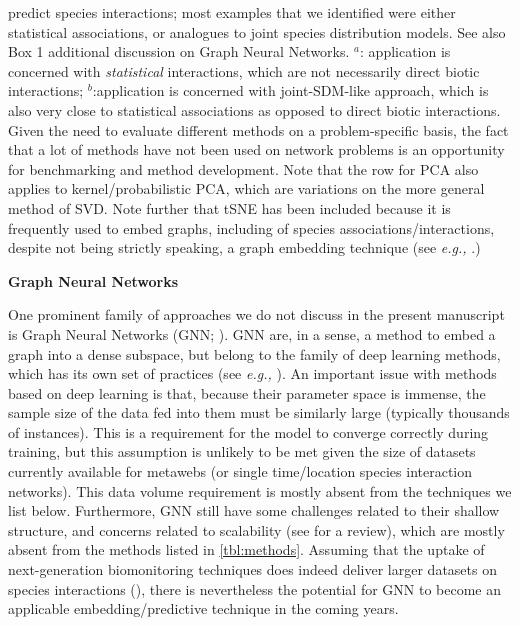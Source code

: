 \begin{refsection}
\begin{table}[h]
{predict species interactions; most examples that we identified were
either statistical associations, or analogues to joint species
distribution models. See also Box 1 additional discussion on Graph Neural Networks. \(^a\): application is concerned with
\emph{statistical} interactions, which are not necessarily direct
biotic interactions; \(^b\):application is concerned with joint-SDM-like
approach, which is also very close to statistical associations as
opposed to direct biotic interactions. Given the need to evaluate
different methods on a problem-specific basis, the fact that a lot of
methods have not been used on network problems is an opportunity for
benchmarking and method development. Note that the row for PCA also
applies to kernel/probabilistic PCA, which are variations on the more
general method of SVD. Note further that tSNE has been included because
it is frequently used to embed graphs, including of species
associations/interactions, despite not being strictly speaking, a graph
embedding technique (see \emph{e.g.,} \cite{Chami2022Machine}.)}
\label{tbl:methods}
\end{table}

\clearpage

\begin{summary}
\textbf{Graph Neural Networks}

One prominent family of approaches we do not discuss in the present
manuscript is Graph Neural Networks (GNN; \cite{Zhou2020Graph}). GNN are,
in a sense, a method to embed a graph into a dense subspace, but belong
to the family of deep learning methods, which has its own set of
practices (see \emph{e.g.,} \cite{Goodfellow2016Deep}). An important issue with
methods based on deep learning is that, because their parameter space is
immense, the sample size of the data fed into them must be similarly
large (typically thousands of instances). This is a requirement for the
model to converge correctly during training, but this assumption is
unlikely to be met given the size of datasets currently available for
metawebs (or single time/location species interaction networks). This
data volume requirement is mostly absent from the techniques we list
below. Furthermore, GNN still have some challenges related to their
shallow structure, and concerns related to scalability (see
\cite{Gupta2021Graph} for a review), which are mostly absent from the
methods listed in \autoref{tbl:methods}. Assuming that the uptake of
next-generation biomonitoring techniques does indeed deliver larger
datasets on species interactions (\cite{Bohan2017Nextgeneration}), there
is nevertheless the potential for GNN to become an applicable
embedding/predictive technique in the coming years.
\end{summary}


\end{refsection}
